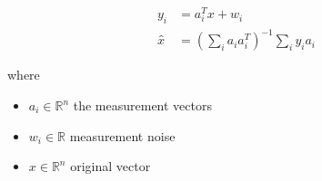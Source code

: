\documentclass[12pt]{article}
\begin{document}
\begin{align*}
\textit{y}_{ \textit{i} } & = \textit{a}_{ \textit{i} }^T\textit{x} + \textit{w}_{ \textit{i} } \\
\textit{x̂} & = \left( \sum_\textit{i} \textit{a}_{ \textit{i} }\textit{a}_{ \textit{i} }^T \right)^{-1}\sum_\textit{i} \textit{y}_{ \textit{i} }\textit{a}_{ \textit{i} }
\end{align*}

where
\begin{itemize}
\item $\textit{a}_{\textit{i}} \in \mathbb{R}^{ \textit{n}}$ the measurement vectors  
\item $\textit{w}_{\textit{i}} \in \mathbb{{R}}$ measurement noise 
\item $\textit{x} \in \mathbb{R}^{ \textit{n}}$ original vector 
\end{itemize}
\end{document}
